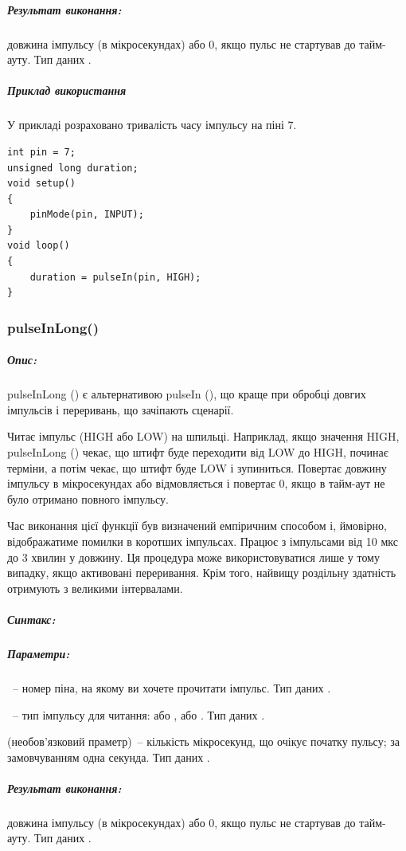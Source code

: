 \documentclass[12pt,a4paper]{report}  %
\begin{document}
\subparagraph{Результат виконання:} довжина імпульсу (в мікросекундах) або 0, якщо пульс не стартував до тайм-ауту. Тип даних .

\subparagraph{Приклад використання}
У прикладі розраховано тривалість часу імпульсу на піні 7.

\begin{lstlisting}[label=digitalwrite,caption=pulseIn]
int pin = 7;
unsigned long duration;
void setup()
{
	pinMode(pin, INPUT);
}
void loop()
{
	duration = pulseIn(pin, HIGH);
}
\end{lstlisting}

\subsubsection{pulseInLong()}\label{pulseInLong}

\subparagraph{Опис:}

pulseInLong () є альтернативою pulseIn (), що краще при обробці довгих імпульсів і переривань, що зачіпають сценарії.

Читає імпульс (HIGH або LOW) на шпильці. Наприклад, якщо значення HIGH, pulseInLong () чекає, що штифт буде переходити від LOW до HIGH, починає терміни, а потім чекає, що штифт буде LOW і зупиниться. Повертає довжину імпульсу в мікросекундах або відмовляється і повертає 0, якщо в тайм-аут не було отримано повного імпульсу.

Час виконання цієї функції був визначений емпіричним способом і, ймовірно, відображатиме помилки в коротших імпульсах. Працює з імпульсами від 10 мкс до 3 хвилин у довжину. Ця процедура може використовуватися лише у тому випадку, якщо активовані переривання. Крім того, найвищу роздільну здатність отримують з великими інтервалами.

\subparagraph{Синтакс:}



\subparagraph{Параметри:}

~-- номер піна, на якому ви хочете прочитати імпульс. Тип даних .

~-- тип імпульсу для читання: або , або . Тип даних .

 (необов'язковий праметр)~-- кількість мікросекунд, що очікує початку пульсу; за замовчуванням одна секунда. Тип даних .

\subparagraph{Результат виконання:} довжина імпульсу (в мікросекундах) або 0, якщо пульс не стартував до тайм-ауту. Тип даних .
\end{document}
